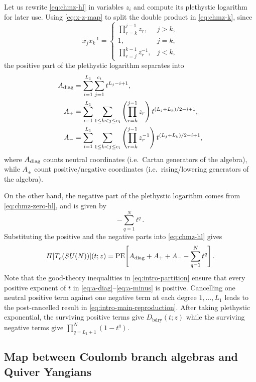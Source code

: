 \documentclass[12pt,a4paper]{article}
\newcommand{\PE}{\operatorname{PE}}
\newcommand{\bdry}{\mathrm{bdry}}
\begin{document}
Let us rewrite \eqref{eq:chmz-hl} in variables $z_i$ and compute its plethystic logarithm for later use. Using
\eqref{eq:x-z-map} to split the double product in \eqref{eq:chmz-k}, since
\begin{equation}
 x_jx_k^{-1}=
 \begin{cases}
 \displaystyle\prod_{r=k}^{j-1}z_r,&j>k,\\[4pt]
 1,&j=k,\\[4pt]
 \displaystyle\prod_{r=j}^{k-1}z_r^{-1},&j<k,
 \end{cases}
 \label{eq:x-ratio-z-string}
\end{equation}
the positive part of the plethystic logarithm separates into
\begin{align}
 A_{\rm diag}
 &=\sum_{i=1}^{L_1}\sum_{j=1}^{c_i}t^{L_j-i+1},
 \label{eq:a-diag}\\
 A_+
 &=\sum_{i=1}^{L_1}\sum_{1\leq k<j\leq c_i}
 \left(\prod_{r=k}^{j-1}z_r\right)
 t^{(L_j+L_k)/2-i+1},
 \label{eq:a-plus}\\
 A_-
 &=\sum_{i=1}^{L_1}\sum_{1\leq k<j\leq c_i}
 \left(\prod_{r=k}^{j-1}z_r^{-1}\right)
 t^{(L_j+L_k)/2-i+1},
 \label{eq:a-minus}
\end{align}
where $A_{\rm{diag}}$ counts neutral coordinates (i.e.\ Cartan generators of the algebra), while $A_\pm$ count positive/negative coordinates (i.e.\ rising/lowering generators of the algebra).

On the other hand, the negative part of the plethystic logarithm comes from
\eqref{eq:chmz-zero-hl}, and is given by
\begin{equation}
    -\sum_{q=1}^N t^q\,.
\end{equation}
Substituting the positive and the negative parts into \eqref{eq:chmz-hl} gives
\begin{equation}
 H[T_\rho(SU(N))](t;z)
 =\PE\!\left[
 A_{\rm diag}+A_++A_- -\sum_{q=1}^{N}t^q
 \right].
 \label{eq:chmz-plethystic}
\end{equation}
Note that the good-theory inequalities in \eqref{eq:intro-partition} ensure that every positive exponent of $t$ in
\eqref{eq:a-diag}--\eqref{eq:a-minus} is positive.  Cancelling one
neutral positive term against one negative term at each degree
$1,\dots,L_1$ leads to the post-cancelled result in
\eqref{eq:intro-main-reproduction}. After taking plethystic exponential, the surviving positive terms give
$D_{\bdry}(t;z)$ while the surviving negative terms give
$\prod_{q=L_1+1}^{N}(1-t^q)$. 



\subsection{Map between Coulomb branch algebras and Quiver Yangians}
\label{subsec:review-qy}
\end{document}
